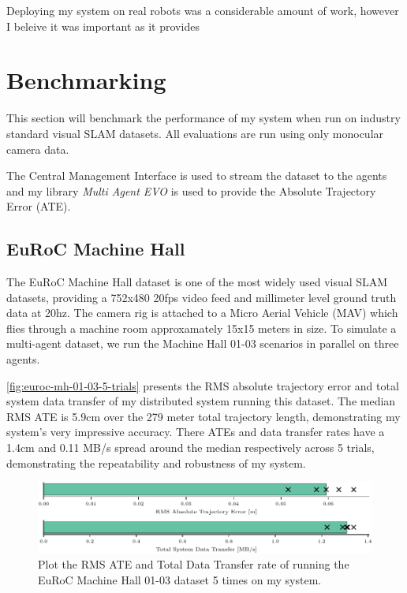 Deploying my system on real robots was a considerable amount of work, however I beleive it was important as it provides

\section{Benchmarking}
\label{sec:benchmarking}
This section will benchmark the performance of my system when run on industry standard visual SLAM datasets. All evaluations are run using only monocular camera data.

The Central Management Interface is used to stream the dataset to the agents and my library \textit{Multi Agent EVO} is used to provide the Absolute Trajectory Error (ATE).

\subsection{EuRoC Machine Hall}
\label{sec:euroc-machine-hall}
The EuRoC Machine Hall dataset \autocite{burri2016euroc} is one of the most widely used visual SLAM datasets, providing a 752x480 20fps video feed and millimeter level ground truth data at 20hz. The camera rig is attached to a Micro Aerial Vehicle (MAV) which flies through a machine room approxamately 15x15 meters in size. To simulate a multi-agent dataset, we run the Machine Hall 01-03 scenarios in parallel on three agents.


\autoref{fig:euroc-mh-01-03-5-trials} presents the RMS absolute trajectory error and total system data transfer of my distributed system running this dataset. The median RMS ATE is 5.9cm over the 279 meter total trajectory length, demonstrating my system's very impressive accuracy. There ATEs and data transfer rates have a 1.4cm and 0.11 MB/s spread around the median respectively across 5 trials, demonstrating the repeatability and robustness of my system.

\begin{figure}[h]
    \centering
    \includegraphics[width=\linewidth]{figures/comparison_apr11_mh_trajectory_b.pdf}

    \caption{Plot the RMS ATE and Total Data Transfer rate of running the EuRoC Machine Hall 01-03 dataset 5 times on my system.}
    \label{fig:euroc-mh-01-03-5-trials}
\end{figure}

